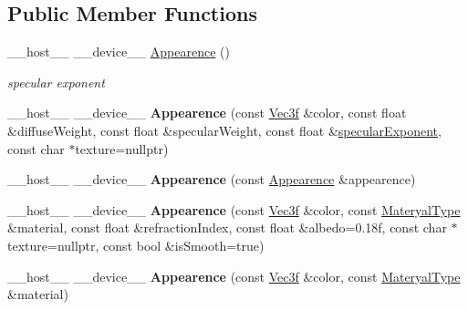 \subsection*{Public Member Functions}
\begin{DoxyCompactItemize}
\item 
\+\_\+\+\_\+host\+\_\+\+\_\+ \+\_\+\+\_\+device\+\_\+\+\_\+ \hyperlink{struct_appearence_a0c68811b3704e25736f38c5cbb6a75bb}{Appearence} ()\hypertarget{struct_appearence_a0c68811b3704e25736f38c5cbb6a75bb}{}\label{struct_appearence_a0c68811b3704e25736f38c5cbb6a75bb}

\begin{DoxyCompactList}\small\item\em specular exponent \end{DoxyCompactList}\item 
\+\_\+\+\_\+host\+\_\+\+\_\+ \+\_\+\+\_\+device\+\_\+\+\_\+ {\bfseries Appearence} (const \hyperlink{class_vec3}{Vec3f} \&color, const float \&diffuse\+Weight, const float \&specular\+Weight, const float \&\hyperlink{struct_appearence_a6bc3ec94dc3c32295d63b09413a78252}{specular\+Exponent}, const char $\ast$texture=nullptr)\hypertarget{struct_appearence_aa99a891cc9fbedd2d11b5f927a4cce0e}{}\label{struct_appearence_aa99a891cc9fbedd2d11b5f927a4cce0e}

\item 
\+\_\+\+\_\+host\+\_\+\+\_\+ \+\_\+\+\_\+device\+\_\+\+\_\+ {\bfseries Appearence} (const \hyperlink{struct_appearence}{Appearence} \&appearence)\hypertarget{struct_appearence_a7cf2e7ec95fd1d245b4b2b22b6a2115c}{}\label{struct_appearence_a7cf2e7ec95fd1d245b4b2b22b6a2115c}

\item 
\+\_\+\+\_\+host\+\_\+\+\_\+ \+\_\+\+\_\+device\+\_\+\+\_\+ {\bfseries Appearence} (const \hyperlink{class_vec3}{Vec3f} \&color, const \hyperlink{group__wrapping__and__description_ga4415a3504a4255d8563ded7496546564}{Materyal\+Type} \&material, const float \&refraction\+Index, const float \&albedo=0.\+18f, const char $\ast$texture=nullptr, const bool \&is\+Smooth=true)\hypertarget{struct_appearence_a622c0e5e935f1a9da3bff963e2b8d6d6}{}\label{struct_appearence_a622c0e5e935f1a9da3bff963e2b8d6d6}

\item 
\+\_\+\+\_\+host\+\_\+\+\_\+ \+\_\+\+\_\+device\+\_\+\+\_\+ {\bfseries Appearence} (const \hyperlink{class_vec3}{Vec3f} \&color, const \hyperlink{group__wrapping__and__description_ga4415a3504a4255d8563ded7496546564}{Materyal\+Type} \&material)\hypertarget{struct_appearence_ad14a7f8346717aaef5c3e06d64e5d98f}{}\label{struct_appearence_ad14a7f8346717aaef5c3e06d64e5d98f}


\end{DoxyCompactItemize}
